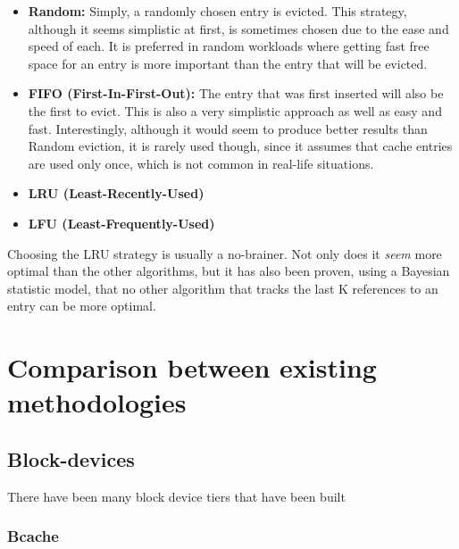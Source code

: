 %
\begin{itemize}
	\item \textbf{Random:} Simply, a randomly chosen entry is evicted. This 
		strategy, although it seems simplistic at first, is sometimes chosen 
		due to the ease and speed of each. It is preferred in random workloads 
		where getting fast free space for an entry is more important than the 
		entry that will be evicted.
	\item \textbf{FIFO (First-In-First-Out):} The entry that was first inserted 
		will also be the first to evict. This is also a very simplistic 
		approach as well as easy and fast. Interestingly, although it would 
		seem to produce better results than Random eviction, it is rarely used 
		though, since it assumes that cache entries are used only once, which 
		is not common in real-life situations.
	\item \textbf{LRU (Least-Recently-Used)}
	\item \textbf{LFU (Least-Frequently-Used)}
\end{itemize}

Choosing the LRU strategy is usually a no-brainer. Not only does it 
\textit{seem} more optimal than the other algorithms, but it has also been 
proven, using a Bayesian statistic model, that no other algorithm that tracks 
the last K references to an entry can be more optimal.



\section{Comparison between existing methodologies}

\subsection{Block-devices}

There have been many block device tiers that have been built


\subsubsection{Bcache}

